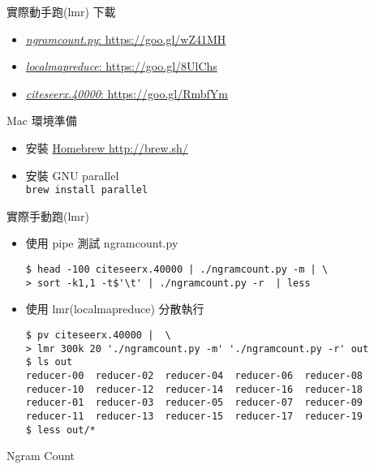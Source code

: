 \documentclass[12pt,c]{beamer}
\begin{document}
\begin{frame}[containsverbatim]{實際動手跑(lmr)}
下載
  \begin{itemize}
  \item \href{https://gist.github.com/eda0890d76a8364fb80f}{\emph{ngramcount.py}: https://goo.gl/wZ41MH} 
  \item \href{https://github.com/d2207197/localmapreduce}{\emph{localmapreduce}: https://goo.gl/8UlChs}
  \item \href{https://gist.github.com/92c52e17ecdc45d47ab1}{\emph{citeseerx.40000}: https://goo.gl/RmbfYm}
  \end{itemize}
Mac 環境準備
\begin{itemize}
\item 安裝 \href{http://brew.sh/}{Homebrew http://brew.sh/}
\item 安裝 GNU parallel \\
\texttt{brew install parallel}
  
\end{itemize}

\end{frame}
\begin{frame}[containsverbatim]{實際手動跑(lmr)}
\begin{itemize}
  \item 使用 pipe 測試 ngramcount.py
\begin{verbatim}
$ head -100 citeseerx.40000 | ./ngramcount.py -m | \
> sort -k1,1 -t$'\t' | ./ngramcount.py -r  | less
\end{verbatim}
\item 使用 lmr(localmapreduce) 分散執行
\begin{verbatim}
$ pv citeseerx.40000 |  \
> lmr 300k 20 './ngramcount.py -m' './ngramcount.py -r' out
$ ls out
reducer-00  reducer-02  reducer-04  reducer-06  reducer-08  reducer-10  reducer-12  reducer-14  reducer-16  reducer-18
reducer-01  reducer-03  reducer-05  reducer-07  reducer-09  reducer-11  reducer-13  reducer-15  reducer-17  reducer-19
$ less out/*
\end{verbatim}
\end{itemize}
\end{frame}


\begin{frame}[allowframebreaks,t]{Ngram Count}
\inputminted[mathescape,
               linenos,
               numbersep=5pt,
               fontsize=\scriptsize,
               frame=lines,
               framesep=2mm]{python}{ngramcount.py}

\end{frame}
\end{document}
